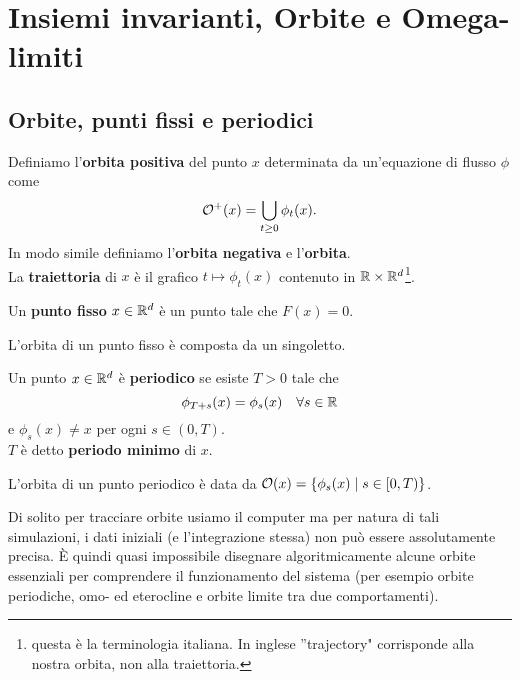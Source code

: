 \chapter{Insiemi invarianti, Orbite e Omega-limiti}

\section{Orbite, punti fissi e periodici}
\begin{definition}[Orbita]
Definiamo l'\textbf{orbita positiva} del punto $x$ determinata da un'equazione di flusso $\phi$ come
\[\mathcal{O}^+(x)=\bigcup_{t\geq 0}\phi_t(x).\]
In modo simile definiamo l'\textbf{orbita negativa} e l'\textbf{orbita}.\\
La \textbf{traiettoria} di $x$ \`e il grafico $t\mapsto \phi_t(x)$ contenuto in $\mathbb{R}\times \mathbb{R}^d$\footnote{questa \`e la terminologia italiana. In inglese ''trajectory" corrisponde alla nostra orbita, non alla traiettoria.}.
\end{definition}

\begin{definition}
Un \textbf{punto fisso} $x\in\mathbb{R}^d$ \`e un punto tale che $F(x)=0$.
\end{definition}
\begin{remark}
L'orbita di un punto fisso \`e composta da un singoletto.
\end{remark}

\begin{definition}
Un punto $x\in\mathbb{R}^d$ \`e \textbf{periodico} se esiste $T>0$ tale che
\[\phi_{T+s}(x)=\phi_s(x)\quad \forall s\in\mathbb{R}\]
e $\phi_s(x)\neq x$ per ogni $s\in (0,T)$.\\
$T$ \`e detto \textbf{periodo minimo} di $x$.
\end{definition}
\begin{remark}
L'orbita di un punto periodico \`e data da
$\mathcal{O}(x)=\left\{{\phi_s(x)\mid s\in[0,T)}\right\}$.
\end{remark}

\begin{remark}[Simulazione]
Di solito per tracciare orbite usiamo il computer ma per natura di tali simulazioni, i dati iniziali (e l'integrazione stessa) non pu\`o essere assolutamente precisa. \`E quindi quasi impossibile disegnare algoritmicamente alcune orbite essenziali per comprendere il funzionamento del sistema (per esempio orbite periodiche, omo- ed eterocline e orbite limite tra due comportamenti). 
\end{remark}


